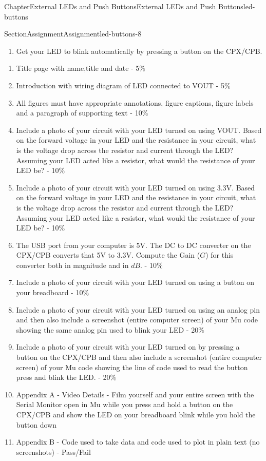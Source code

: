 \documentclass[oneside,10pt,]{book}
\numberwithin{equation}{section}
\begin{document}
\begin{chapterptx}{Chapter}{External LEDs and Push Buttons}{}{External LEDs and Push Buttons}{}{}{led-buttons}
\begin{sectionptx}{Section}{Assignment}{}{Assignment}{}{}{led-buttons-8}
\begin{introduction}{}
\begin{enumerate}
\item{}Get your LED to blink automatically by pressing a button on the CPX\slash{}CPB.%
\end{enumerate}
%
%
\begin{enumerate}
\item{}Title page with name,title and date - 5\%%
\item{}Introduction with wiring diagram of LED connected to VOUT - 5\%%
\item{}All figures must have appropriate annotations, figure captions, figure labels and a paragraph of supporting text - 10\%%
\item{}Include a photo of your circuit with your LED turned on using VOUT. Based on the forward voltage in your LED and the resistance in your circuit, what is the voltage drop across the resistor and current through the LED? Assuming your LED acted like a resistor, what would the resistance of your LED be? - 10\%%
\item{}Include a photo of your circuit with your LED turned on using 3.3V. Based on the forward voltage in your LED and the resistance in your circuit, what is the voltage drop across the resistor and current through the LED? Assuming your LED acted like a resistor, what would the resistance of your LED be? - 10\%%
\item{}The USB port from your computer is 5V. The DC to DC converter on the CPX\slash{}CPB converts that 5V to 3.3V. Compute the Gain (\(G\)) for this converter both in magnitude and in \(dB\). - 10\%%
\item{}Include a photo of your circuit with your LED turned on using a button on your breadboard - 10\%%
\item{}Include a photo of your circuit with your LED turned on using an analog pin and then also include a screenshot (entire computer screen) of your Mu code showing the same analog pin used to blink your LED - 20\%%
\item{}Include a photo of your circuit with your LED turned on by pressing a button on the CPX\slash{}CPB and then also include a screenshot (entire computer screen) of your Mu code showing the line of code used to read the button press and blink the LED. - 20\%%
\item{}Appendix A - Video Details - Film yourself and your entire screen with the Serial Monitor open in Mu while you press and hold a button on the CPX\slash{}CPB and show the LED on your breadboard blink while you hold the button down%
\item{}Appendix B - Code used to take data and code used to plot in plain text (no screenshots) - Pass\slash{}Fail%

\end{enumerate}
\end{introduction}
\end{sectionptx}
\end{chapterptx}
\end{document}
